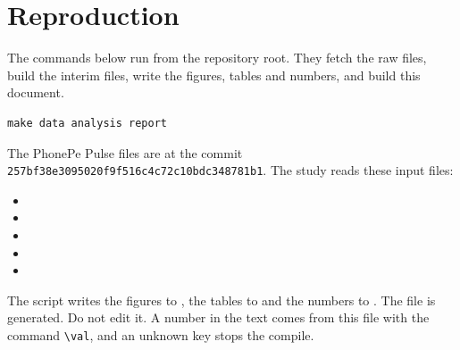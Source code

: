 \documentclass[11pt,a4paper]{article}
\makeatletter
\newcommand{\val}[1]{\ifcsname val@#1\endcsname\csname val@#1\endcsname\else
  \PackageError{study}{Unknown value key `#1'}{Run Rscript src/R/part1_study.R}\fi}
\makeatother
\begin{document}
\section{Reproduction}\label{app:repro}
The commands below run from the repository root. They fetch the raw files, build the interim files, write the figures, tables and numbers, and build this document.
\begin{verbatim}
make data analysis report
\end{verbatim}
The PhonePe Pulse files are at the commit \texttt{257bf38e3095020f9f516c4c72c10bdc348781b1}. The study reads these input files:
\begin{itemize}
\item {}
\item {}
\item {}
\item {}
\item {}
\end{itemize}
The script  writes the figures to , the tables to  and the numbers to . The file  is generated. Do not edit it. A number in the text comes from this file with the command \verb|\val|, and an unknown key stops the compile.
\end{document}
